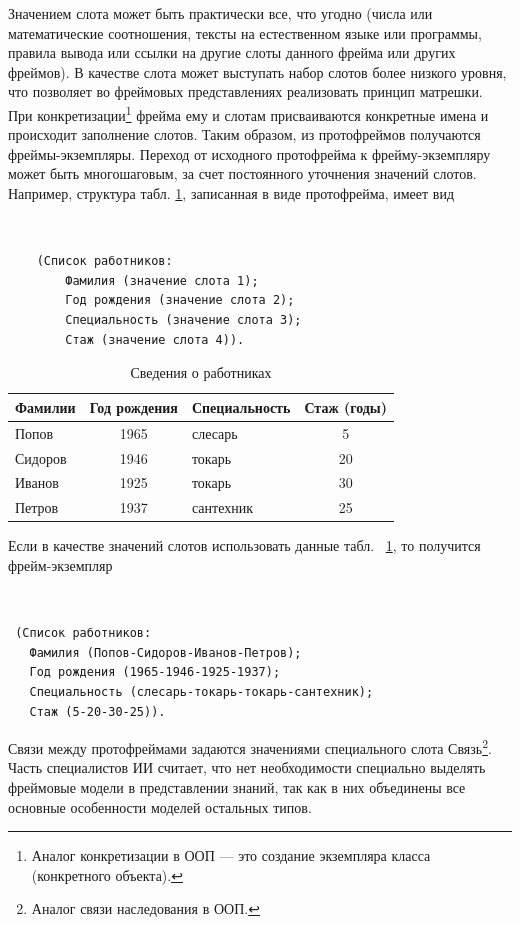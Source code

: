 \documentclass[12pt, openany, twoside]{book} %
\begin{document}
Значением слота может быть практически все, что угодно (числа или математические соотношения, тексты на естественном языке или программы, правила вывода или ссылки на другие слоты данного фрейма или других фреймов). В качестве слота может выступать набор слотов более низкого уровня, что позволяет во фреймовых представлениях реализовать принцип матрешки. При конкретизации\footnote{Аналог конкретизации в ООП --- это создание экземпляра класса (конкретного объекта).} фрейма ему и слотам присваиваются конкретные имена и происходит заполнение слотов. Таким образом, из протофреймов получаются фреймы-экземпляры. Переход от исходного протофрейма к фрейму-эк\-зем\-пля\-ру может быть многошаговым, за счет постоянного
уточнения значений слотов. Например, структура табл. \ref{tab:frame}, записанная в виде протофрейма, имеет вид
{\tt
\begin{verbatim}
    (Список работников:
        Фамилия (значение слота 1);
        Год рождения (значение слота 2);
        Специальность (значение слота 3);
        Стаж (значение слота 4)).
\end{verbatim}}

\begin{table}[h]
\caption{Сведения о работниках} \label{tab:frame}
\begin{center}
\begin{tabular}{|lclc|}
 \hline
 Фамилии & Год рождения  &  Специальность &  Стаж (годы)
 \\\hline\hline
 Попов &  1965 &   слесарь & 5
   \\\hline
   Сидоров & 1946  &  токарь & 20
    \\\hline
    Иванов & 1925  &  токарь & 30
    \\\hline
    Петров & 1937  &  сантехник &  25
    \\\hline
\end{tabular}
\end{center}
\end{table}

Если в качестве значений слотов использовать данные табл.~ \ref{tab:frame}, то получится фрейм-экземпляр
{\tt
\begin{verbatim}
 (Список работников:
   Фамилия (Попов-Сидоров-Иванов-Петров);
   Год рождения (1965-1946-1925-1937);
   Специальность (слесарь-токарь-токарь-сантехник);
   Стаж (5-20-30-25)).
\end{verbatim}}

Связи между протофреймами задаются значениями специального слота Связь\footnote{Аналог связи наследования в ООП.}. Часть специалистов ИИ считает, что нет необходимости специально выделять фреймовые модели в представлении знаний, так как в них объединены все основные особенности моделей остальных типов.
\end{document}
